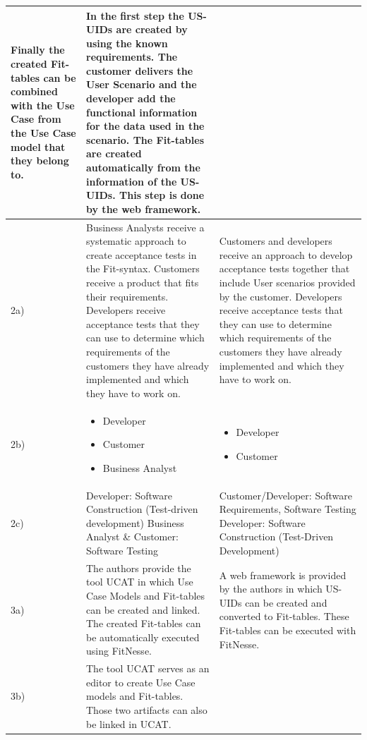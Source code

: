 \begin{small}
\begin{longtable}[h]{p{0.45cm}|p{}|p{}}
Finally the created Fit-tables can be combined with the Use Case from the Use Case model that they belong to.
 & In the first step the US-UIDs are created by using the known requirements.
The customer delivers the User Scenario and the developer add the functional information for the data used in the scenario.
The Fit-tables are created automatically from the information of the US-UIDs. This step is done by the web framework.\\
\hline
  2a) & Business Analysts receive a systematic approach to create acceptance tests in the Fit-syntax.
Customers receive a product that fits their requirements.
Developers receive acceptance tests that they can use to determine which requirements of the customers they have already implemented and which they have to work on.
 & Customers and developers receive an approach to develop acceptance tests together that include User scenarios provided by the customer.
Developers receive acceptance tests that they can use to determine which requirements of the customers they have already implemented and which they have to work on.
 \\
  \hline
  		 2b) & 
  		 	\begin{itemize}
  		 		\item Developer 
  		 		\item Customer 
  		 		\item  Business Analyst
			\end{itemize}  		 
			& \begin{itemize}
  		 		\item Developer 
  		 		\item Customer
				\end{itemize}\\
	 \hline
  		 2c) & Developer: Software Construction (Test-driven development) \newline
Business Analyst \& Customer: Software Testing
 & Customer/Developer: Software Requirements, Software Testing \newline
Developer: Software Construction (Test-Driven Development)
 \\
  		\hline
  		 3a) & The authors provide the tool UCAT in which Use Case Models and Fit-tables can be created and linked. The created Fit-tables can be automatically executed using FitNesse. & A web framework is provided by the authors in which US-UIDs can be created and converted to Fit-tables. These Fit-tables can be executed with FitNesse. \\
  	 \hline
  		 3b) & The tool UCAT serves as an editor to create Use Case models and Fit-tables. Those two artifacts can also be linked in UCAT.

\end{longtable}
\end{small}
